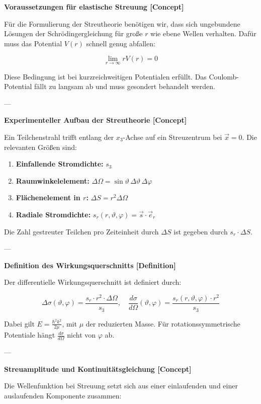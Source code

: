 \documentclass[10pt, letterpaper]{article}
\begin{document}
\textbf{Voraussetzungen für elastische Streuung [Concept]}

Für die Formulierung der Streutheorie benötigen wir, dass sich ungebundene Lösungen der Schrödingergleichung für große $r$ wie ebene Wellen verhalten. Dafür muss das Potential $V(r)$ schnell genug abfallen:

\[
\lim_{r \to \infty} r V(r) = 0
\]

Diese Bedingung ist bei kurzreichweitigen Potentialen erfüllt. Das Coulomb-Potential fällt zu langsam ab und muss gesondert behandelt werden.

---


\textbf{Experimenteller Aufbau der Streutheorie [Concept]}

Ein Teilchenstrahl trifft entlang der $x_3$-Achse auf ein Streuzentrum bei $\vec{x} = 0$. Die relevanten Größen sind:

\begin{enumerate}
  \item \textbf{Einfallende Stromdichte:} $s_3$
  \item \textbf{Raumwinkelelement:} $\Delta\Omega = \sin\vartheta \, \Delta\vartheta \, \Delta\varphi$
  \item \textbf{Flächenelement in $r$:} $\Delta S = r^2 \Delta \Omega$
  \item \textbf{Radiale Stromdichte:} $s_r(r, \vartheta, \varphi) = \vec{s} \cdot \vec{e}_r$
\end{enumerate}

Die Zahl gestreuter Teilchen pro Zeiteinheit durch $\Delta S$ ist gegeben durch $s_r \cdot \Delta S$.

---

\textbf{Definition des Wirkungsquerschnitts [Definition]}

Der differentielle Wirkungsquerschnitt ist definiert durch:

\[
\Delta \sigma(\vartheta, \varphi) = \frac{s_r \cdot r^2 \cdot \Delta \Omega}{s_3}, \quad
\frac{d\sigma}{d\Omega}(\vartheta, \varphi) = \frac{s_r(r, \vartheta, \varphi) \cdot r^2}{s_3}
\]

Dabei gilt $E = \frac{\hbar^2 k^2}{2\mu}$, mit $\mu$ der reduzierten Masse. Für rotationssymmetrische Potentiale hängt $\frac{d\sigma}{d\Omega}$ nicht von $\varphi$ ab.

---

\textbf{Streuamplitude und Kontinuitätsgleichung [Concept]}

Die Wellenfunktion bei Streuung setzt sich aus einer einlaufenden und einer auslaufenden Komponente zusammen:
\end{document}
